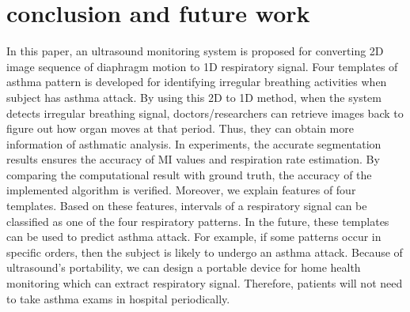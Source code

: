 \section{conclusion and future work} \label{sec.conclusion}
In this paper, an ultrasound monitoring system is proposed for converting 2D image sequence of diaphragm motion to 1D respiratory signal. Four templates of asthma pattern is developed for identifying irregular breathing activities when subject has asthma attack. By using this 2D to 1D method, when the system detects irregular breathing signal, doctors/researchers can retrieve images back to figure out how organ moves at that period. Thus, they can obtain more information of asthmatic analysis. In experiments, the accurate segmentation results ensures the accuracy of MI values and respiration rate estimation. By comparing the computational result with ground truth, the accuracy of the implemented algorithm is verified. Moreover, we explain features of four templates. Based on these features, intervals of a respiratory signal can be classified as one of the four respiratory patterns. In the future, these templates can be used to predict asthma attack. For example, if some patterns occur in specific orders, then the subject is likely to undergo an asthma attack. Because of ultrasound's portability, we can design a portable device for home health monitoring which can extract respiratory signal. Therefore, patients will not need to take asthma exams in hospital periodically. 
